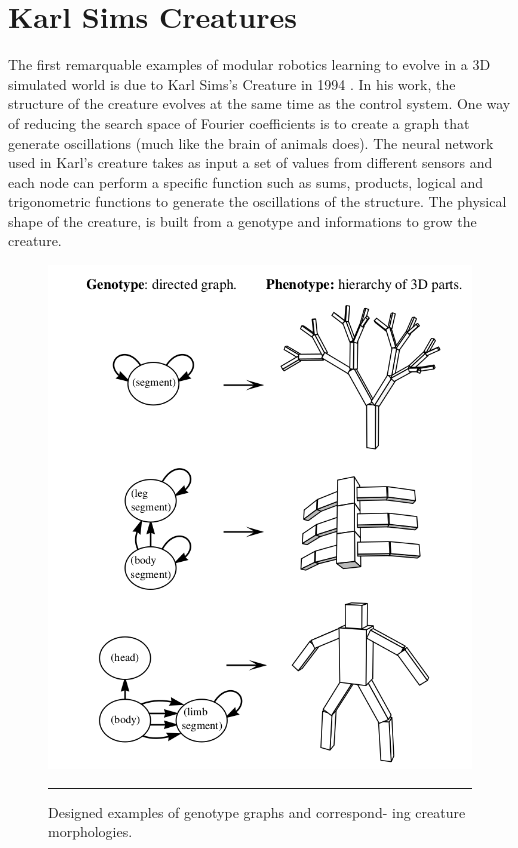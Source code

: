 \section{Karl Sims Creatures}
The first remarquable examples of modular robotics learning to evolve in a 3D simulated world is due to Karl Sims's Creature in 1994 \cite{karl}. In his work, the structure of the creature evolves at the same time as the control system. One way of reducing the search space of Fourier coefficients is to create a graph that generate oscillations (much like the brain of animals does). The neural network used in Karl's creature takes as input a set of values from different sensors and each node can perform a specific function such as sums, products, logical and trigonometric functions to generate the oscillations of the structure. The physical shape of the creature, is built from a genotype and informations to grow the creature.   
 
\begin{figure}[htbp]
    \centering
    \includegraphics[scale=0.3]{Figures/sims_genotype.png}
    \rule{35em}{0.5pt}
    \caption[Designed examples of genotype graphs and correspond-
    ing creature morphologies.]{Designed examples of genotype graphs and correspond-
    ing creature morphologies.}
    \label{fig:sims_genotype}
\end{figure}

